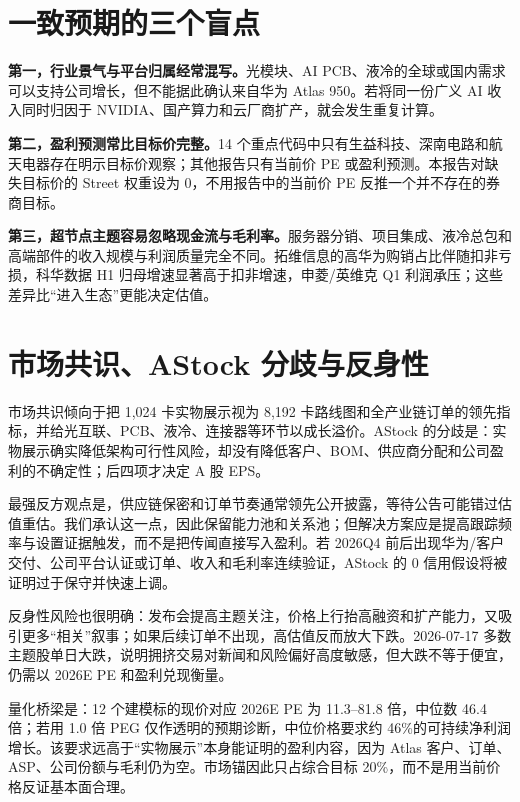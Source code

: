 \section{一致预期的三个盲点}

\textbf{第一，行业景气与平台归属经常混写。}光模块、AI PCB、液冷的全球或国内需求可以支持公司增长，但不能据此确认来自华为 Atlas 950。若将同一份广义 AI 收入同时归因于 NVIDIA、国产算力和云厂商扩产，就会发生重复计算。

\textbf{第二，盈利预测常比目标价完整。}14 个重点代码中只有生益科技、深南电路和航天电器存在明示目标价观察；其他报告只有当前价 PE 或盈利预测。本报告对缺失目标价的 Street 权重设为 0，不用报告中的当前价 PE 反推一个并不存在的券商目标。

\textbf{第三，超节点主题容易忽略现金流与毛利率。}服务器分销、项目集成、液冷总包和高端部件的收入规模与利润质量完全不同。拓维信息的高华为购销占比伴随扣非亏损，科华数据 H1 归母增速显著高于扣非增速，申菱/英维克 Q1 利润承压；这些差异比“进入生态”更能决定估值。

\section{市场共识、AStock 分歧与反身性}

市场共识倾向于把 1,024 卡实物展示视为 8,192 卡路线图和全产业链订单的领先指标，并给光互联、PCB、液冷、连接器等环节以成长溢价。AStock 的分歧是：实物展示确实降低架构可行性风险，却没有降低客户、BOM、供应商分配和公司盈利的不确定性；后四项才决定 A 股 EPS。

最强反方观点是，供应链保密和订单节奏通常领先公开披露，等待公告可能错过估值重估。我们承认这一点，因此保留能力池和关系池；但解决方案应是提高跟踪频率与设置证据触发，而不是把传闻直接写入盈利。若 2026Q4 前后出现华为/客户交付、公司平台认证或订单、收入和毛利率连续验证，AStock 的 0 信用假设将被证明过于保守并快速上调。

反身性风险也很明确：发布会提高主题关注，价格上行抬高融资和扩产能力，又吸引更多“相关”叙事；如果后续订单不出现，高估值反而放大下跌。2026-07-17 多数主题股单日大跌，说明拥挤交易对新闻和风险偏好高度敏感，但大跌不等于便宜，仍需以 2026E PE 和盈利兑现衡量。

量化桥梁是：12 个建模标的现价对应 2026E PE 为 11.3--81.8 倍，中位数 46.4 倍；若用 1.0 倍 PEG 仅作透明的预期诊断，中位价格要求约 46\%的可持续净利润增长。该要求远高于“实物展示”本身能证明的盈利内容，因为 Atlas 客户、订单、ASP、公司份额与毛利仍为空。市场锚因此只占综合目标 20\%，而不是用当前价格反证基本面合理。



